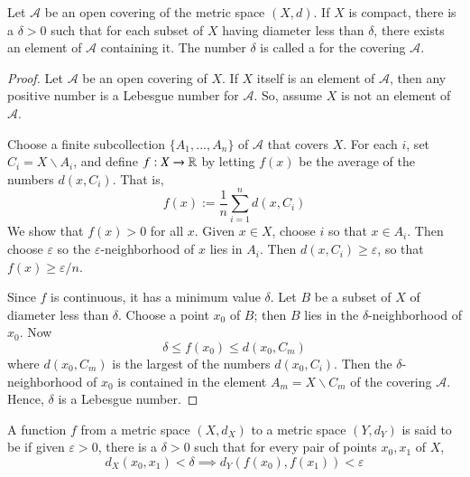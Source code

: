 \documentclass[12pt, a4paper, oneside, openright, titlepage]{book}
\begin{document}
\begin{lemma}
    Let $\mathcal{A}$ be an open covering of the metric space $(X,d)$. If $X$ is compact, there is a $\delta > 0$ such that for each subset of $X$ having diameter less than $\delta$, there exists an element of $\mathcal{A}$ containing it. The number $\delta$ is called a  for the covering $\mathcal{A}$.
\end{lemma}
\begin{proof}
    Let $\mathcal{A}$ be an open covering of $X$. If $X$ itself is an element of $\mathcal{A}$, then any positive number is a Lebesgue number for $\mathcal{A}$. So, assume $X$ is not an element of $\mathcal{A}$.

    Choose a finite subcollection $\{A_1,...,A_n\}$ of $\mathcal{A}$ that covers $X$. For each $i$, set $C_i = X\backslash A_i$, and define $f:X\rightarrow \mathbb R$ by letting $f(x)$ be the average of the numbers $d(x,C_i)$. That is, \begin{equation*}
        f(x) := \frac{1}{n}\sum\limits_{i=1}^nd(x,C_i)
    \end{equation*}
    We show that $f(x) > 0$ for all $x$. Given $x \in X$, choose $i$ so that $x \in A_i$. Then choose $\varepsilon$ so the $\varepsilon$-neighborhood of $x$ lies in $A_i$. Then $d(x,C_i)\geq \varepsilon$, so that $f(x) \geq \varepsilon/n$.

    Since $f$ is continuous, it has a minimum value $\delta$. Let $B$ be a subset of $X$ of diameter less than $\delta$. Choose a point $x_0$ of $B$; then $B$ lies in the $\delta$-neighborhood of $x_0$. Now \begin{equation*}
        \delta \leq f(x_0) \leq d(x_0,C_m)
    \end{equation*}
    where $d(x_0,C_m)$ is the largest of the numbers $d(x_0,C_i)$. Then the $\delta$-neighborhood of $x_0$ is contained in the element $A_m = X\backslash C_m$ of the covering $\mathcal{A}$. Hence, $\delta$ is a Lebesgue number.
\end{proof}

\begin{definition}
    A function $f$ from a metric space $(X,d_X)$ to a metric space $(Y,d_Y)$ is said to be  if given $\varepsilon > 0$, there is a $\delta > 0$ such that for every pair of points $x_0,x_1$ of $X$, \begin{equation*}
        d_X(x_0,x_1)<\delta \implies d_Y(f(x_0),f(x_1)) < \varepsilon
    \end{equation*}
\end{definition}
\end{document}
